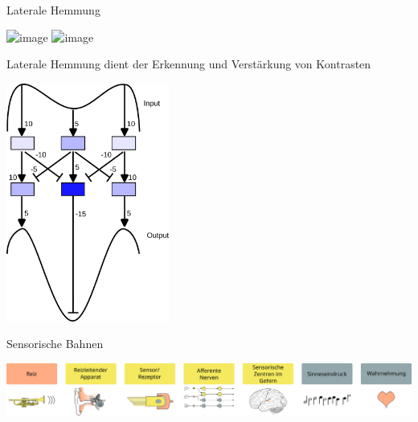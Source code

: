 \documentclass{beamer}
\begin{document}
\begin{frame}{Laterale Hemmung}

\begin{center}

    \includegraphics<1>[width=\textwidth]{lateral_inhibition_funkction_1.png}
        \includegraphics<2>[width=\textwidth]{lateral_inhibition_funkction_2.png}
\end{center}

\end{frame}


\begin{frame}{Laterale Hemmung dient der Erkennung und Verstärkung von Kontrasten }

\begin{center}
    \includegraphics[width=0.4\textwidth]{laterale_hemmung.png}
\end{center}


\end{frame}

\begin{frame}{Sensorische Bahnen}
\begin{center}
    \includegraphics[width=\textwidth]{wahrnehmungsprozess.png}
\end{center}
    
\end{frame}



\end{document}
